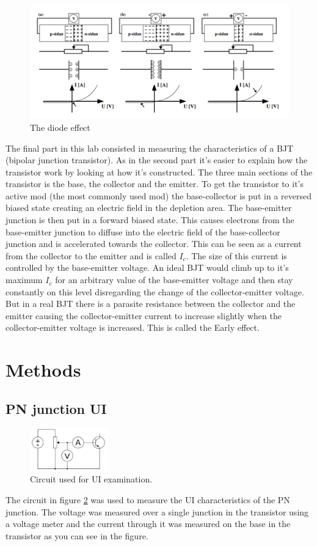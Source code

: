 \documentclass[a4paper]{article}
\begin{document}
\begin{figure}[H]
\centering
\includegraphics[scale=0.3]{diodeeffect.png}
\caption{The diode effect}
\label{diode}
\end{figure}

The final part in this lab consisted in measuring the characteristics of a BJT (bipolar junction transistor). As in the second part it's easier to explain how the transistor work by looking at how it's constructed. The three main sections of the transistor is the base, the collector and the emitter. To get the transistor to it's active mod (the most commonly used mod) the base-collector is put in a reversed biased state creating an electric field in the depletion area. The base-emitter junction is then put in a forward biased state. This causes electrons from the base-emitter junction to diffuse into the electric field of the base-collector junction and is accelerated towards the collector. This can be seen as a current from the collector to the emitter and is called $I_c$. The size of this current is controlled by the base-emitter voltage. An ideal BJT would climb up to it's maximum $I_c$ for an arbitrary value of the base-emitter voltage and then stay constantly on this level disregarding the change of the collector-emitter voltage. But in a real BJT there is a parasite resistance between the collector and the emitter causing the collector-emitter current to increase slightly when the collector-emitter voltage is increased. This is called the Early effect.

\section{Methods}
\subsection{PN junction UI}
\begin{figure}[H]
	\centering
	\includegraphics[width=0.3\textwidth]{ui_koppling.png}
	\caption{Circuit used for UI examination.}
	\label{ui_koppling}
\end{figure}
The circuit in figure \ref{ui_koppling} was used to measure the UI characteristics of the PN junction. The voltage was measured over a single junction in the transistor using a voltage meter and the current through it was measured on the base in the transistor as you can see in the figure.
\end{document}
